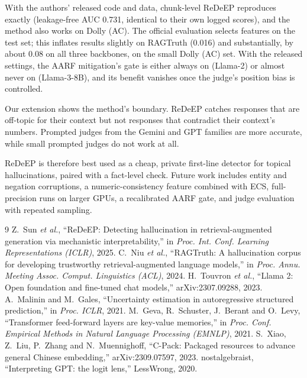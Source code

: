 \documentclass[conference]{IEEEtran}
\begin{document}
With the authors' released code and data, chunk-level ReDeEP reproduces exactly (leakage-free AUC 0.731, identical to their own logged scores), and the method also works on Dolly (AC). The official evaluation selects features on the test set; this inflates results slightly on RAGTruth (0.016) and substantially, by about 0.08 on all three backbones, on the small Dolly (AC) set. With the released settings, the AARF mitigation's gate is either always on (Llama-2) or almost never on (Llama-3-8B), and its benefit vanishes once the judge's position bias is controlled.

Our extension shows the method's boundary. ReDeEP catches responses that are off-topic for their context but not responses that contradict their context's numbers. Prompted judges from the Gemini and GPT families are more accurate, while small prompted judges do not work at all.

ReDeEP is therefore best used as a cheap, private first-line detector for topical hallucinations, paired with a fact-level check. Future work includes entity and negation corruptions, a numeric-consistency feature combined with ECS, full-precision runs on larger GPUs, a recalibrated AARF gate, and judge evaluation with repeated sampling.

\begin{thebibliography}{9}
 Z.~Sun \emph{et al.}, ``ReDeEP: Detecting hallucination in retrieval-augmented generation via mechanistic interpretability,'' in \emph{Proc. Int. Conf. Learning Representations (ICLR)}, 2025.
 C.~Niu \emph{et al.}, ``RAGTruth: A hallucination corpus for developing trustworthy retrieval-augmented language models,'' in \emph{Proc. Annu. Meeting Assoc. Comput. Linguistics (ACL)}, 2024.
 H.~Touvron \emph{et al.}, ``Llama 2: Open foundation and fine-tuned chat models,'' arXiv:2307.09288, 2023.
 A.~Malinin and M.~Gales, ``Uncertainty estimation in autoregressive structured prediction,'' in \emph{Proc. ICLR}, 2021.
 M.~Geva, R.~Schuster, J.~Berant and O.~Levy, ``Transformer feed-forward layers are key-value memories,'' in \emph{Proc. Conf. Empirical Methods in Natural Language Processing (EMNLP)}, 2021.
 S.~Xiao, Z.~Liu, P.~Zhang and N.~Muennighoff, ``C-Pack: Packaged resources to advance general Chinese embedding,'' arXiv:2309.07597, 2023.
 nostalgebraist, ``Interpreting GPT: the logit lens,'' LessWrong, 2020.
\end{thebibliography}
\end{document}
